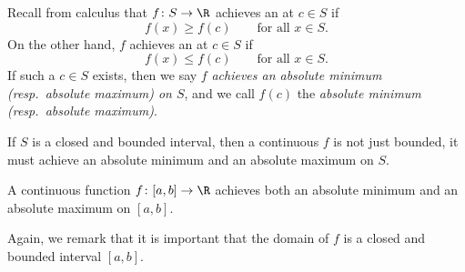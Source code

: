 Recall from calculus that $f \colon S \to \R$ achieves an
\emph{}%
at $c \in S$ if
\begin{equation*}
f(x) \geq f(c) \qquad \text{for all } x \in S.
\end{equation*}
On the other hand, $f$ achieves an 
\emph{}%
at $c \in S$ if
\begin{equation*}
f(x) \leq f(c) \qquad \text{for all } x \in S.
\end{equation*}
If such a $c \in S$ exists, then we say
$f$ \emph{achieves an absolute minimum (resp.\ absolute maximum) on
$S$}, and we call
$f(c)$ the \emph{absolute minimum (resp.\ absolute maximum)}.
\begin{myfigureht}
\caption{$f \colon [a,b] \to \R$ achieves an absolute maximum $f(c)$ at
$c$, and an absolute minimum $f(d)$ at $d$.\label{fig:minmax}}
\end{myfigureht}

If $S$ is a closed
and bounded interval, then a continuous $f$
is not just bounded, it must achieve an absolute minimum and an absolute
maximum on $S$.

\begin{thm}
%
%
%
A continuous function $f \colon [a,b] \to \R$
achieves both an absolute minimum and an absolute maximum on $[a,b]$.
\end{thm}

Again, we remark that it is important that the domain of $f$ is a closed and bounded interval $[a,b]$.


